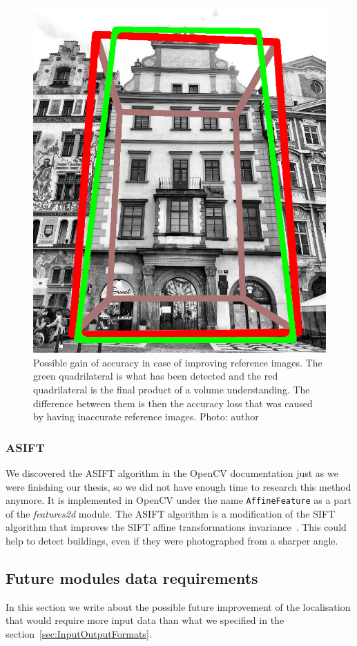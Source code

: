 \documentclass[thesis=B,english]{FITthesis}[2019/12/23]
\begin{document}
            \begin{figure}
                \centering
                \includegraphics[width = 0.5\linewidth]{pictures/future/possibleAccuracyGain.jpg}
                \caption[Possible gain of accuracy in case of improving reference images]{Possible gain of accuracy in case of improving reference images. The green quadrilateral is what has been detected and the red quadrilateral is the final product of a volume understanding. The difference between them is then the accuracy loss that was caused by having inaccurate reference images. Photo: author}
                \label{possibleGainOfAccuracy}
            \end{figure}

            \subsubsection*{ASIFT}
            We discovered the ASIFT algorithm in the OpenCV documentation just as we were finishing our thesis, so we did not have enough time to research this method anymore. It is implemented in OpenCV under the name \texttt{AffineFeature} as a part of the \textit{features2d} module. The ASIFT algorithm is a modification of the SIFT algorithm that improves the SIFT affine transformations invariance~\cite{yu2011asift}. This could help to detect buildings, even if they were photographed from a sharper angle.
        
        \subsection{Future modules data requirements}
            In this section we write about the possible future improvement of the localisation that would require more input data than what we specified in the section~\ref{sec:InputOutputFormats}.
            
\end{document}
